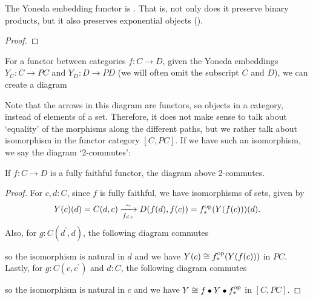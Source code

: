 \begin{lemma}
  The Yoneda embedding functor is . That is, not only does it preserve binary products, but it also preserves exponential objects (\autocite{stackexchange:yoneda-exponentials}).
\end{lemma}
\begin{proof}
  \TODO
\end{proof}

For a functor between categories $ f: C \to D $, given the Yoneda embeddings $ Y_C : C \to P C $ and $ Y_D : D \to P D $ (we will often omit the subscript $ C $ and $ D $), we can create a diagram
\begin{center}
\end{center}
Note that the arrows in this diagram are functors, so objects in a category, instead of elements of a set. Therefore, it does not make sense to talk about `equality' of the morphisms along the different paths, but we rather talk about isomorphism in the functor category $ [C, P C] $. If we have such an isomorphism, we say the diagram `2-commutes':
\begin{lemma}\label{lem:Yoneda-restriction-commutes}
  If $ f: C \to D $ is a fully faithful functor, the diagram above 2-commutes.
\end{lemma}
\begin{proof}
  For $ c, d : C $, since $ f $ is fully faithful, we have isomorphisms of sets, given by
  \[ Y(c)(d) = C(d, c) \xrightarrow[f_{d, c}]{\sim} D(f(d), f(c)) = f^{\text{op}}_*(Y(f(c)))(d). \]
  Also, for $ g: C(d^\prime, d) $, the following diagram commutes
  \begin{center}
  \end{center}
  so the isomorphism is natural in $ d $ and we have $ Y(c) \cong f^{\text{op}}_*(Y(f(c))) $ in $ P C $. Lastly, for $ g: C(c, c^\prime) $ and $ d: C $, the following diagram commutes
  \begin{center}
  \end{center}
  so the isomorphism is natural in $ c $ and we have $ Y \cong f \bullet Y \bullet f^{\text{op}}_* $ in $ [C, P C] $.
\end{proof}


